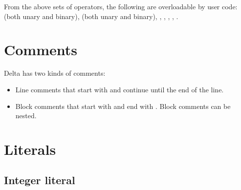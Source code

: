 From the above sets of operators, the following are overloadable by user code:
\code{+} (both unary and binary), \code{-} (both unary and binary), \code{*},
\code{/}, \code{\%}, \code{==}, \code{<}.

\section{Comments}

Delta has two kinds of comments:

\begin{itemize}
\item Line comments that start with \code{//} and continue until the end of the line.
\item Block comments that start with \code{/*} and end with \code{*/}. Block comments can be nested.
\end{itemize}

\section{Literals}

\subsection{Integer literal}


